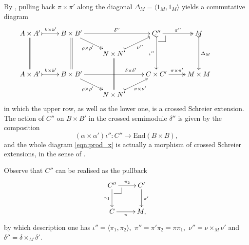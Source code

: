 \documentclass[a4paper]{amsart}
\makeatletter
\theoremstyle{plain}
\theoremstyle{definition}
\theoremstyle{remark}
\newcommand{\pullback}[4]{{#1 \leftindex_{#2}{\times}_{#3} #4}}
\newcommand{\la}{\langle}
\newcommand{\ra}{\rangle}
\def\pullback{%
 \ar@{-}[]+R+<4pt,-3pt>;[]+RD+<4pt,-6pt>%
 \ar@{-}[]+D+<3pt,-6pt>;[]+RD+<4pt,-6pt>}
\makeatother
\begin{document}
By \cite{AMMPS}, pulling back $\pi\times \pi'$ along the diagonal $\Delta_M=\la 1_M,1_M\ra$ yields a commutative diagram
\begin{equation}
\label{eqn:prod_x}
\begin{aligned}
\xymatrixrowsep{1.3pc}
\xymatrix{
{A\times A'} \ar@{=}[dd] \ar@{>->}[r]^-{k\times k'} &{B\times B'} \ar@{=}[dd] \ar@{->>}[rd]_-{\rho\times\rho'} \ar[rr]^-{\delta''} & \ &{C''} \ar@{->>}[r]^-{\pi''} \pullback \ar@{>->}[dd]_-{\iota''} &{M} \ar@{>->}[dd]^-{\Delta_M} \\
 &\ &{N\times N'} \ar@{=}[dd]  \ar@{>->}[ru]_-{\nu''}&\ &\ &\ \\
 {A\times A'} \ar@{>->}[r]^-{k\times k'} &{B\times B'} \ar@{->>}[rd]_-{\rho\times\rho'} \ar[rr]^(.70){\delta\times\delta'} & \ &{C\times C'} \ar@{->>}[r]^-{\pi\times \pi'} &{M\times M} \\
 &\ &{N\times N'} \ar@{>->}[ru]_-{\nu\times\nu'}&\ &\ &\
}
\end{aligned}
\end{equation}
in which the upper row, as well as the lower one, is a crossed Schreier extension. The action of $C''$ on $B\times B'$ in the crossed semimodule $\delta''$ is given by the composition
\begin{equation}
\label{eqn:prodact2}
(\alpha\times \alpha')\iota''\colon C''\longrightarrow\mathrm{End}(B\times B),
\end{equation}
and the whole diagram \eqref{eqn:prod_x} is actually a morphism of crossed Schreier extensions, in the sense of \cite{AMMPS}.

Observe that $C''$ can be realised as the pullback
\begin{equation*}
\xymatrix{
{C''} \ar[r]^-{\pi_2} \ar[d]_-{\pi_1} \pullback &{C'} \ar[d]^-{\pi'} \\
{C} \ar[r]_-{\pi} &{M,}
}
\end{equation*}
by which description one has $\iota''=\la\pi_1,\pi_2 \ra,$ $\pi''=\pi'\pi_2=\pi\pi_1,$ $\nu''=\nu\times_M\nu'$ and $\delta''=\delta\times_M\delta'.$
\end{document}
